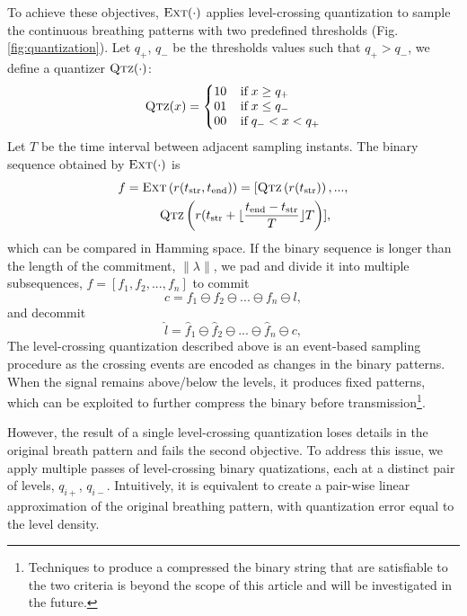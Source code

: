 To achieve these objectives, $\textsc{Ext} (\cdot)$ applies level-crossing quantization to sample the continuous breathing patterns with two predefined thresholds (Fig. \ref{fig:quantization}). Let $q_{+}$, $q_{-}$ be the thresholds values such that $q_{+} > q_{-}$, we define a quantizer $\textsc{Qtz} (\cdot)$:
\begin{equation*}
  \setlength{\arraycolsep}{0pt}
    \textsc{Qtz} (x) = \left\{ \begin{array}{ l l }
    10 &\;\;\;\;\text{if}\; x \geq q_{+} \\
    01 &\;\;\;\;\text{if}\; x \leq q_{-} \\
    00 &\;\;\;\;\text{if}\; q_{-} < x < q_{+}
  \end{array} \right.
\end{equation*}
Let $T$ be the time interval between adjacent sampling instants. The binary sequence obtained by $\textsc{Ext} (\cdot)$ is
\begin{multline*}
f = \textsc{Ext} \left(r(t_{\text{str}}, t_{\text{end}})\right) = [\textsc{Qtz} \left( r(t_{\text{str}}) \right),...,\\
    \;\;\;\;\;\;\;\textsc{Qtz} \left(r(t_{\text{str}} + \lfloor\frac{t_{\text{end}} - t_{\text{str}}}{T}\rfloor T \right)],
\end{multline*}
which can be compared in Hamming space.
If the binary sequence is longer than the length of the commitment,  $\|\lambda\|$, we pad and divide it into multiple subsequences, $f = [ f_1, f_2,...,f_n]$ to commit
\begin{equation}
c = f_1 \ominus f_2 \ominus ... \ominus f_n \ominus l,
\end{equation}
and decommit
\begin{equation}
\hat{l} = \hat{f}_1 \ominus \hat{f}_2 \ominus ... \ominus \hat{f}_n \ominus c,
\end{equation}
The level-crossing quantization described above is an event-based sampling procedure as the crossing events are encoded as changes in the binary patterns. When the signal remains above/below the levels, it produces fixed patterns, which can be exploited to further compress the binary before transmission\footnote{Techniques to produce a compressed the binary string that are satisfiable to the two criteria is beyond the scope of this article and will be investigated in the future.}. 


However, the result of a single level-crossing quantization loses details in the original breath pattern and fails the second objective. To address this issue, we apply multiple passes of level-crossing binary quatizations, each at a distinct pair of levels, $q_{i+}$, $q_{i-}$. Intuitively, it is equivalent to create a pair-wise linear approximation of the original breathing pattern, with quantization error equal to the level density.

